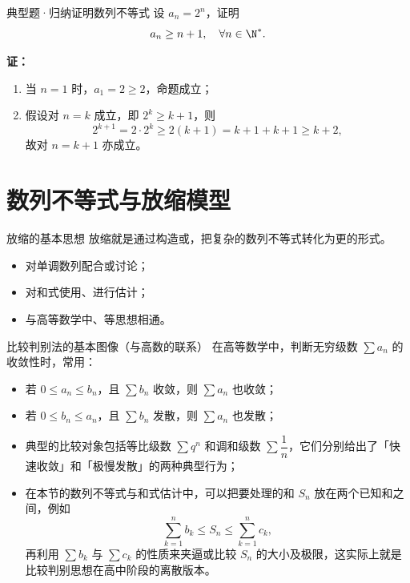 \documentclass[a4paper,11pt]{ctexart}
\begin{document}
\begin{examplebox}{典型题·归纳证明数列不等式}
  设 $a_n=2^n$，证明
  \[
    a_n\ge n+1,\quad \forall n\in\N^*.
  \]

  \textbf{证：}
  \begin{enumerate}
    \item 当 $n=1$ 时，$a_1=2\ge2$，命题成立；
    \item 假设对 $n=k$ 成立，即 $2^k\ge k+1$，则
    \[
      2^{k+1}=2\cdot2^k\ge2(k+1)=k+1+k+1\ge k+2,
    \]
    故对 $n=k+1$ 亦成立。
  \end{enumerate}
\end{examplebox}

\clearpage
\section{数列不等式与放缩模型}

\begin{definitionbox}{放缩的基本思想}
  放缩就是通过构造或，把复杂的数列不等式转化为更的形式。
  \begin{itemize}
    \item 对单调数列配合或讨论；
    \item 对和式使用、进行估计；
    \item 与高等数学中、等思想相通。
  \end{itemize}
\end{definitionbox}

\begin{sideinfobox}{比较判别法的基本图像（与高数的联系）}
  在高等数学中，判断无穷级数 $\sum a_n$ 的收敛性时，常用：
  \begin{itemize}
    \item 若 $0\le a_n\le b_n$，且 $\sum b_n$ 收敛，则 $\sum a_n$ 也收敛；
    \item 若 $0\le b_n\le a_n$，且 $\sum b_n$ 发散，则 $\sum a_n$ 也发散；
    \item 典型的比较对象包括等比级数 $\sum q^n$ 和调和级数 $\sum\dfrac{1}{n}$，它们分别给出了「快速收敛」和「极慢发散」的两种典型行为；
    \item 在本节的数列不等式与和式估计中，可以把要处理的和 $S_n$ 放在两个已知和之间，例如
    \[
      \sum_{k=1}^{n}b_k\le S_n\le\sum_{k=1}^{n}c_k,
    \]
    再利用 $\sum b_k$ 与 $\sum c_k$ 的性质来夹逼或比较 $S_n$ 的大小及极限，这实际上就是比较判别思想在高中阶段的离散版本。
  \end{itemize}
\end{sideinfobox}
\end{document}
